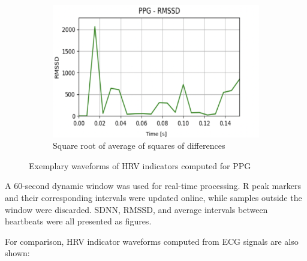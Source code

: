 \documentclass{citask}
\begin{document}
\begin{figure}[h]
    \vspace{0.2cm}  
    \begin{subfigure}{0.47\textwidth}
        \centering
        \includegraphics[width=\linewidth]{images/RMSSD.png}
        \caption{Square root of average of squares of differences}
    \end{subfigure}  
    \caption{Exemplary waveforms of HRV indicators computed for PPG}
\end{figure}

\newpage
A 60-second dynamic window was used for real-time processing. R peak markers and their corresponding intervals were updated online, while samples outside the window were discarded. SDNN, RMSSD, and average intervals between heartbeats were all presented as figures.

For comparison, HRV indicator waveforms computed from ECG signals are also shown:
\end{document}
